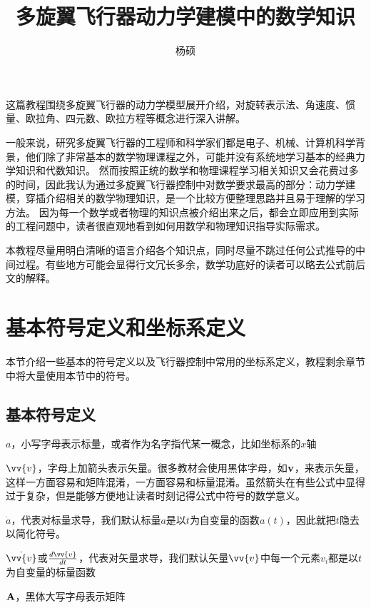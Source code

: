 \documentclass[11pt]{article}
\begin{document}
\title{多旋翼飞行器动力学建模中的数学知识}
\author{杨硕}

\maketitle
这篇教程围绕多旋翼飞行器的动力学模型展开介绍，对旋转表示法、角速度、惯量、欧拉角、四元数、欧拉方程等概念进行深入讲解。

一般来说，研究多旋翼飞行器的工程师和科学家们都是电子、机械、计算机科学背景，他们除了非常基本的数学物理课程之外，可能并没有系统地学习基本的经典力学知识和代数知识。
然而按照正统的数学和物理课程学习相关知识又会花费过多的时间，因此我认为通过多旋翼飞行器控制中对数学要求最高的部分：动力学建模，穿插介绍相关的数学物理知识，是一个比较方便整理思路并且易于理解的学习方法。
因为每一个数学或者物理的知识点被介绍出来之后，都会立即应用到实际的工程问题中，读者很直观地看到如何用数学和物理知识指导实际需求。

本教程尽量用明白清晰的语言介绍各个知识点，同时尽量不跳过任何公式推导的中间过程。有些地方可能会显得行文冗长多余，数学功底好的读者可以略去公式前后文的解释。

\section{基本符号定义和坐标系定义}
本节介绍一些基本的符号定义以及飞行器控制中常用的坐标系定义，教程剩余章节中将大量使用本节中的符号。
\subsection{基本符号定义}
$a$，小写字母表示标量，或者作为名字指代某一概念，比如坐标系的$x$轴

$\vv{v}$，字母上加箭头表示矢量。很多教材会使用黑体字母，如$\bf{v}$，来表示矢量，这样一方面容易和矩阵混淆，一方面容易和标量混淆。虽然箭头在有些公式中显得过于复杂，但是能够方便地让读者时刻记得公式中符号的数学意义。

$\dot{a}$，代表对标量求导，我们默认标量$a$是以$t$为自变量的函数$a(t)$，因此就把$t$隐去以简化符号。

$\dot{\vv{v}}$或$\frac{d\vv{v}}{dt}$，代表对矢量求导，我们默认矢量$\vv{v}$中每一个元素$v_i$都是以$t$为自变量的标量函数

$\bf{A}$，黑体大写字母表示矩阵
\end{document}

